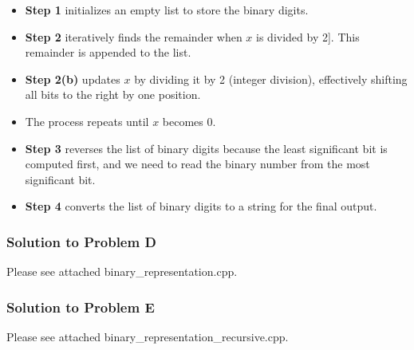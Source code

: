 \documentclass{article}
\begin{document}
\begin{itemize}
\begin{itemize}
    \item \textbf{Step 1} initializes an empty list to store the binary digits.
    \item \textbf{Step 2} iteratively finds the remainder when \( x \) is divided by 2]. This remainder is appended to the list.
    \item \textbf{Step 2(b)} updates \( x \) by dividing it by 2 (integer division), effectively shifting all bits to the right by one position.
    \item The process repeats until \( x \) becomes 0.
    \item \textbf{Step 3} reverses the list of binary digits because the least significant bit is computed first, and we need to read the binary number from the most significant bit.
    \item \textbf{Step 4} converts the list of binary digits to a string for the final output.
\end{itemize}

\subsubsection*{Solution to Problem D} Please see attached binary_representation.cpp.

\subsubsection*{Solution to Problem E} Please see attached binary_representation_recursive.cpp.

\end{itemize}
\end{document}
